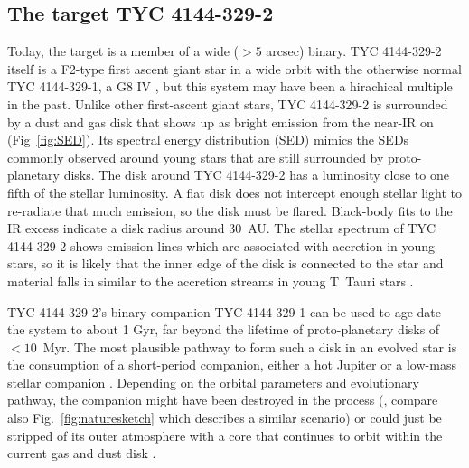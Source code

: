 \documentclass[letterpaper,11pt]{article}
\begin{document}
\subsection*{The target TYC 4144-329-2}

Today, the target is a member of a wide ($> 5$ arcsec) binary. TYC 4144-329-2 itself is a F2-type first ascent giant star in a wide orbit with the otherwise normal  TYC 4144-329-1, a G8 IV \cite{2009ApJ...696.1964M}, but this system may have been a hirachical multiple in the past. Unlike other first-ascent giant stars, TYC 4144-329-2 is surrounded by a dust and gas disk that shows up as bright emission from the near-IR on (Fig~\ref{fig:SED}). Its spectral energy distribution (SED) mimics the SEDs commonly observed around young stars that are still surrounded by proto-planetary disks. The disk around TYC 4144-329-2 has a luminosity close to one fifth of the stellar luminosity. A flat disk does not intercept enough stellar light to re-radiate that much emission, so the disk must be flared. Black-body fits to the IR excess indicate a disk radius around 30~AU. The stellar spectrum of TYC 4144-329-2 shows emission lines which are associated with accretion in young stars, so it is likely that the inner edge of the disk is connected to the star and material falls in similar to the accretion streams in young T~Tauri stars \cite{2009ApJ...696.1964M}. 

TYC 4144-329-2's binary companion TYC 4144-329-1 can be used to age-date the system \cite{2009ApJ...696.1964M} to about 1 Gyr, far beyond the lifetime of proto-planetary disks of $<10$~Myr. The most plausible pathway to form such a disk in an evolved star is the consumption of a short-period companion, either a hot Jupiter or a low-mass stellar companion \cite{2009ApJ...696.1964M}. Depending on the orbital parameters and evolutionary pathway, the companion might have been destroyed in the process (\cite{2003ApJ...582.1032J}, compare also Fig.~\ref{fig:naturesketch} which describes a similar scenario) or could just be stripped of its outer atmosphere with a core that continues to orbit within the current gas and dust disk \cite{2003ASPC..293...76W}.
\end{document}
